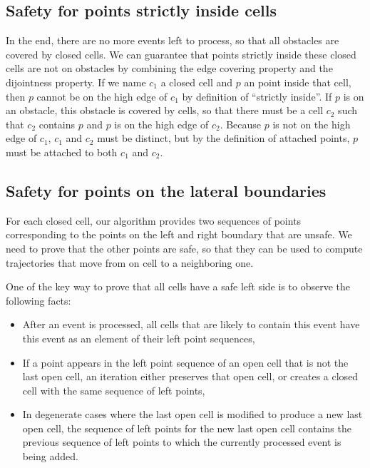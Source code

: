 \documentclass[a4paper, USenglish, cleveref, autoref, thm-restate]{lipics-v2021}
\begin{document}
\subsection{Safety for points strictly inside cells}
In the end, there are no more events left to process, so that all
obstacles are covered by closed cells.  
We can guarantee that points strictly inside these closed cells are not
on obstacles by combining the edge covering property and the
dijointness property.  If we name \(c_1\) a closed cell and \(p\) an
point inside that cell, then \(p\) cannot be on the high edge of
\(c_1\) by definition of ``strictly inside''.  If \(p\) is on an
obstacle, this obstacle is covered by cells, so that there must be a
cell \(c_2\) such that \(c_2\) contains \(p\) and \(p\) is on the high
edge of \(c_2\).  Because \(p\) is not on the high edge of \(c_1\),
\(c_1\) and \(c_2\) must be distinct, but by the definition of
attached points, \(p\) must be attached to both \(c_1\) and \(c_2\).
\subsection{Safety for points on the lateral boundaries}
For each closed cell, our algorithm provides two sequences of points
corresponding to the points on the left and right boundary that are
unsafe.  We need to prove that the other points are safe, so that they
can be used to compute trajectories that move from on cell to a
neighboring one.

One of the key way to prove that all cells have a safe left side is to
observe the following facts:
\begin{itemize}
\item After an event is processed, all cells that are likely to
  contain this event have this event as an element of their left point
  sequences,
\item If a point appears in the left point sequence of an open cell
  that is not the last open cell, an iteration either preserves that
  open cell, or creates a closed cell with the same sequence of left
  points,
\item In degenerate cases where the last open cell is modified to
  produce a new last open cell, the sequence of left points for the
  new last open cell contains the previous sequence of left points to
  which the currently processed event is being added.
\end{itemize}
\end{document}
